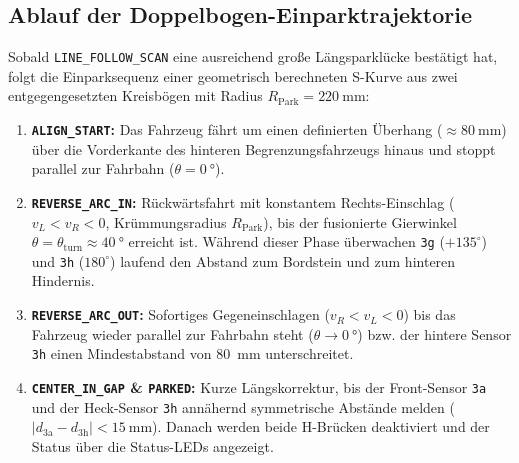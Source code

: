 \subsection{Ablauf der Doppelbogen-Einparktrajektorie}
Sobald \texttt{LINE\_FOLLOW\_SCAN} eine ausreichend große Längsparklücke bestätigt hat, folgt die Einparksequenz einer geometrisch berechneten S-Kurve aus zwei entgegengesetzten Kreisbögen mit Radius $R_{\mathrm{Park}} = \qty{220}{\milli\meter}$:
\begin{enumerate}
  \item \textbf{\texttt{ALIGN\_START}:} Das Fahrzeug fährt um einen definierten Überhang ($\approx \qty{80}{\milli\meter}$) über die Vorderkante des hinteren Begrenzungsfahrzeugs hinaus und stoppt parallel zur Fahrbahn ($\theta = \qty{0}{\degree}$).
  \item \textbf{\texttt{REVERSE\_ARC\_IN}:} Rückwärtsfahrt mit konstantem Rechts-Einschlag ($v_L < v_R < 0$, Krümmungsradius $R_{\mathrm{Park}}$), bis der fusionierte Gierwinkel $\theta = \theta_{\mathrm{turn}} \approx \qty{40}{\degree}$ erreicht ist. Während dieser Phase überwachen \texttt{3g} ($+135^\circ$) und \texttt{3h} ($180^\circ$) laufend den Abstand zum Bordstein und zum hinteren Hindernis.
  \item \textbf{\texttt{REVERSE\_ARC\_OUT}:} Sofortiges Gegeneinschlagen ($v_R < v_L < 0$) bis das Fahrzeug wieder parallel zur Fahrbahn steht ($\theta \to \qty{0}{\degree}$) bzw. der hintere Sensor \texttt{3h} einen Mindestabstand von \qty{80}{\milli\meter} unterschreitet.
  \item \textbf{\texttt{CENTER\_IN\_GAP} \& \texttt{PARKED}:} Kurze Längskorrektur, bis der Front-Sensor \texttt{3a} und der Heck-Sensor \texttt{3h} annähernd symmetrische Abstände melden ($|d_{\mathrm{3a}} - d_{\mathrm{3h}}| < \qty{15}{\milli\meter}$). Danach werden beide H-Brücken deaktiviert und der Status über die Status-LEDs angezeigt.
\end{enumerate}

